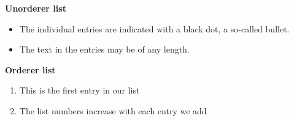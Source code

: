 \documentclass{article}
\begin{document}

    \textbf{Unorderer list}

    \begin{itemize}
        \item The individual entries are indicated with a black dot, a so-called bullet.
        \item The text in the entries may be of any length.
    \end{itemize}


    \textbf{Orderer list}

    \begin{enumerate}
        \item This is the first entry in our list
        \item The list numbers increase with each entry we add
    \end{enumerate}
\end{document}
